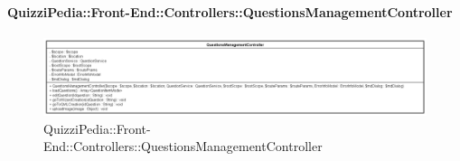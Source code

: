\paragraph[QuizziPedia::Front-End::Controllers\\::QuestionsManagementController]{QuizziPedia::Front-End::Controllers::QuestionsManagementController}
\begin{figure} [ht]
	\centering
	\includegraphics[scale=0.35]{UML/Classi/Front-End/QuizziPedia_Front-end_Controller_QuestionsManagementController.png}
	\caption{QuizziPedia::Front-End::Controllers::QuestionsManagementController}
\end{figure} \FloatBarrier

